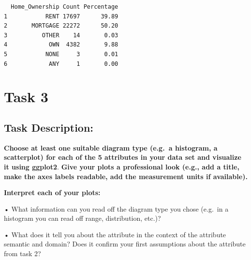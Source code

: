 \documentclass[
  letterpaper,
  DIV=11,
  numbers=noendperiod]{scrartcl}
\begin{document}
\begin{verbatim}
  Home_Ownership Count Percentage
1           RENT 17697      39.89
2       MORTGAGE 22272      50.20
3          OTHER    14       0.03
4            OWN  4382       9.88
5           NONE     3       0.01
6            ANY     1       0.00
\end{verbatim}

\hypertarget{task-3}{%
\section{Task 3}\label{task-3}}

\hypertarget{task-description-2}{%
\subsection{Task Description:}\label{task-description-2}}

\textbf{Choose at least one suitable diagram type (e.g.~a histogram, a
scatterplot) for each of the 5 attributes in your data set and visualize
it using ggplot2}. \textbf{Give your plots a professional look (e.g.,
add a title, make the axes labels readable, add the measurement units if
available).}

\textbf{Interpret each of your plots:}

• What information can you read off the diagram type you chose (e.g.~in
a histogram you can read off range, distribution, etc.)?

• What does it tell you about the attribute in the context of the
attribute semantic and domain? Does it confirm your first assumptions
about the attribute from task 2?
\end{document}
